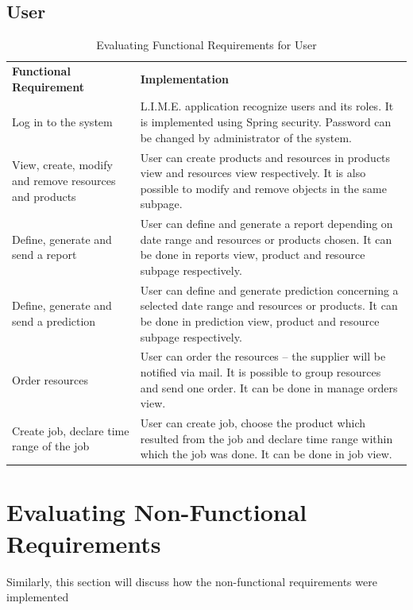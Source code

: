 \documentclass[a4paper,11pt,twoside]{report}
\theoremstyle{definition}
\begin{document}
\subsection{User}

\begin{longtable}{|p{4cm}|p{12cm}|}
\caption[Evaluating Functional Requirements for User]{Evaluating Functional Requirements for User}
\label{Evaluating Functional Requirements for User}
\centering
\tabularnewline

\hline
\textbf{Functional \mbox{Requirement}} & \textbf{Implementation} \\ \hline
Log in to the system & L.I.M.E. application recognize users and its roles. It is implemented using Spring security. Password can be changed by administrator of the system. \\ \hline
View, create, modify and remove resources and products & User can create products and resources in products view and resources view respectively. It is also possible to modify and remove objects in the same subpage. \\ \hline
Define, generate and send a report & User can define and generate a report depending on date range and resources or products chosen. It can be done in reports view, product and resource subpage respectively. \\ \hline
Define, generate and send a prediction & User can define and generate prediction concerning a selected date range and resources or products. It can be done in prediction view, product and resource subpage respectively. \\ \hline
Order resources & User can order the resources – the supplier will be notified via mail. It is possible to group resources and send one order. It can be done in manage orders view. \\ \hline
Create job, declare time range of the job & User can create job, choose the product which resulted from the job and declare time range within which the job was done. It can be done in job view. \\ \hline




\end{longtable}

\section{Evaluating Non-Functional Requirements}

Similarly, this section will discuss how the non-functional requirements were implemented
\end{document}
